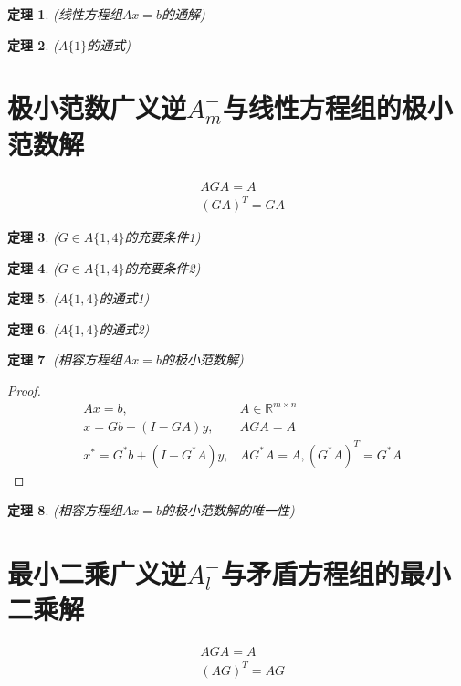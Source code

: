 \documentclass[twoside]{article}
\newtheorem{theorem}{定理}[section]
\begin{document}
\begin{theorem}
(线性方程组$Ax=b$的通解)
\end{theorem}

\begin{theorem}
($A\{1\}$的通式)
\end{theorem}

\section{极小范数广义逆$A_m^-$与线性方程组的极小范数解}
\begin{equation*}
    \begin{aligned}
        & AGA = A \\
        & (GA)^T = GA
    \end{aligned}
\end{equation*}

\begin{theorem}
($G\in A\{1,4\}$的充要条件1)
\end{theorem}

\begin{theorem}
($G\in A\{1,4\}$的充要条件2)
\end{theorem}

\begin{theorem}
($A\{1,4\}$的通式1)
\end{theorem}

\begin{theorem}
($A\{1,4\}$的通式2)
\end{theorem}

\begin{theorem}
(相容方程组$Ax=b$的极小范数解)
\end{theorem}
\begin{proof}
\begin{equation*}
    \begin{aligned}
        & Ax=b, & A\in\mathds{R}^{m\times n} \\
        & x = Gb + (I-GA)y, & AGA=A \\
        & x^* = G^*b + (I-G^*A)y, & AG^*A=A, (G^*A)^T=G^*A
    \end{aligned}
\end{equation*}
\end{proof}

\begin{theorem}
(相容方程组$Ax=b$的极小范数解的唯一性)
\end{theorem}

\section{最小二乘广义逆$A^-_l$与矛盾方程组的最小二乘解}
\begin{equation*}
    \begin{aligned}
        & AGA = A \\
        & (AG)^T = AG
    \end{aligned}
\end{equation*}
\end{document}
